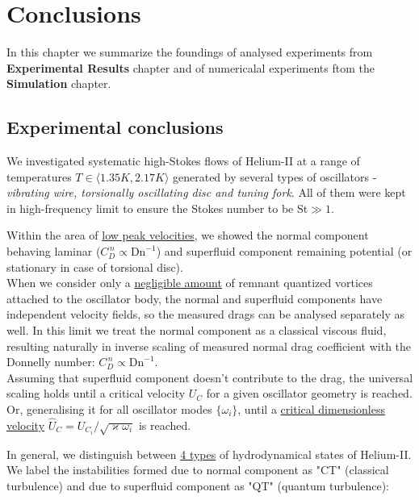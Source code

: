 \chapter{Conclusions}

In this chapter we summarize the foundings of analysed experiments from \textbf{Experimental Results} chapter and of numericalal experiments ftom the \textbf{Simulation} chapter.

\section{Experimental conclusions}

We investigated systematic high-Stokes flows of Helium-II at a range of temperatures $T \in \langle 1.35 \unit{K}, 2.17 \unit{K} \rangle$ generated by several types of oscillators - \textit{vibrating wire, torsionally oscillating disc and tuning
fork}. All of them were kept in high-frequency limit to ensure the Stokes number to be St$\gg 1$.

Within the area of \underline{low peak velocities}, we showed the normal component behaving laminar ($C_D^{\, n} \propto \text{Dn}^{-1}$) and superfluid component remaining potential (or stationary in case of torsional disc).\\
When we consider only a \underline{negligible amount} of remnant quantized vortices attached to the oscillator body, the normal and superfluid components have independent velocity fields, so the measured drags can be analysed separately as well. In this limit we treat the normal component as a classical viscous fluid, resulting naturally in inverse scaling of measured normal drag coefficient with the Donnelly number: $C_D^{\, n} \propto \text{Dn}^{-1}$.\\
Assuming that superfluid component doesn't contribute to the drag, the universal scaling holds until a critical velocity $U_C$ for a given oscillator geometry is reached. Or, generalising it for all oscillator modes $\{\omega_i\}$, until a \underline{critical dimensionless velocity} $\hat{U}_C = U_{C_i} / \sqrt{\varkappa \omega_i}$ is reached.

In general, we distinguish between \underline{4 types} of hydrodynamical states of Helium-II. We label the instabilities formed due to normal component as "CT" (classical turbulence) and due to superfluid component as "QT" (quantum turbulence):

